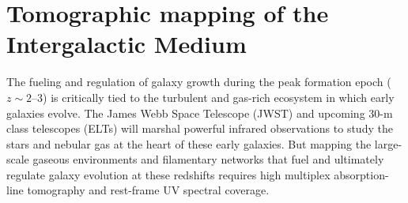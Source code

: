 \documentclass[11pt,a4paper,twoside,onecolumn,openany,final,oldfontcommands]{memoir}
\begin{document}


  


\section{Tomographic mapping of the Intergalactic Medium}

The fueling and regulation of galaxy growth during the peak formation epoch ($z \sim2$--3) is critically tied to the turbulent and gas-rich ecosystem in which early galaxies evolve. The James Webb Space Telescope (JWST) and upcoming 30-m class telescopes (ELTs) will marshal powerful infrared observations to study the stars and nebular gas at the heart of these early galaxies. But mapping the large-scale gaseous environments and filamentary networks that fuel and ultimately regulate galaxy evolution at these redshifts requires high multiplex absorption-line tomography and rest-frame UV spectral coverage.
\end{document}
